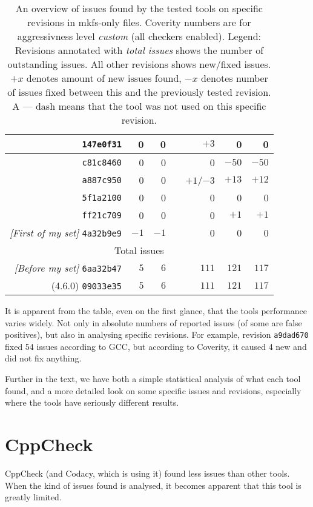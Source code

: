 \begin{table}[h]
\begin{tabular}{|r||r|r|r|r|r|r|}
\hline
{\tt 147e0f31} & 0 & 0 & & $+3$ & 0 & 0 \\
\hline
{\tt c81c8460} & 0 & 0 & & 0 & $-50$ & $-50$ \\
\hline
{\tt a887c950} & 0 & 0 & & $+1$/$-3$ & $+13$ & $+12$ \\
\hline
{\tt 5f1a2100} & 0 & 0 & & 0 & 0 & 0 \\
\hline
{\tt ff21c709} & 0 & 0 & & 0 & $+1$ & $+1$ \\
\hline
{\em [First of my set]} {\tt 4a32b9e9} & $-1$ & $-1$ & & 0 & 0 & 0 \\
\hline
\hline
\multicolumn{7}{|c|}{Total issues} \\
\hline
{\em [Before my set]} {\tt 6aa32b47} & $5$ & $6$ & & $111$ & $121$ & $117$ \\
\hline
(4.6.0) {\tt 09033e35} & $5$ & $6$ & & $111$ & $121$ & $117$ \\
\hline
\end{tabular}
\caption{An overview of issues found by the tested tools on specific revisions
	in mkfs-only files. Coverity numbers are for aggressivness level {\em
	custom} (all checkers enabled).\newline
	\newline
	Legend: Revisions annotated with {\em total issues} shows the
	number of outstanding issues. All other revisions shows new/fixed
	issues.  $+x$ denotes amount of new issues found, $-x$ denotes number
	of issues fixed between this and the previously tested revision. A ---
	dash means that the tool was not used on this specific revision.}


\label{tab:results:overview}
\end{table}

It is apparent from the table, even on the first glance, that the tools
performance varies widely. Not only in absolute numbers of reported issues (of
some are false positives), but also in analysing specific revisions. For
example, revision {\tt a9dad670} fixed 54 issues according to GCC, but
according to Coverity, it caused 4 new and did not fix anything.

Further in the text, we have both a simple statistical analysis of what each
tool found, and a more detailed look on some specific issues and revisions,
especially where the tools have seriously different results.



\section{CppCheck}\label{chap:results:cppcheck}
CppCheck (and Codacy, which is using it) found less issues than other
tools. When the kind of issues found is analysed, it becomes apparent that
this tool is greatly limited.

